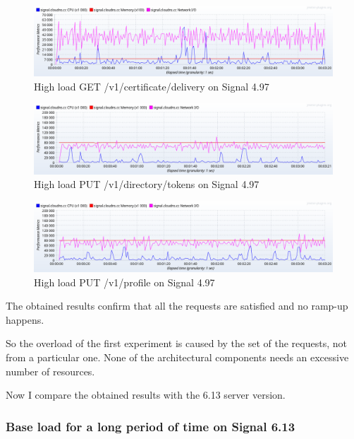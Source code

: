 \begin{figure}[H]
    \centering
    \includegraphics[width=\textwidth]{images/497/create-load-6}
    \caption{High load GET /v1/certificate/delivery on Signal 4.97}
    \label{fig:signalload6old}
\end{figure}


\begin{figure}[H]
    \centering
    \includegraphics[width=\textwidth]{images/497/create-load-7}
    \caption{High load PUT /v1/directory/tokens on Signal 4.97}
    \label{fig:signalload7old}
\end{figure}


\begin{figure}[H]
    \centering
    \includegraphics[width=\textwidth]{images/497/create-load-8}
    \caption{High load PUT /v1/profile on Signal 4.97}
    \label{fig:signalload8old}
\end{figure}

The obtained results confirm that all the requests are satisfied and no ramp-up happens.

So the overload of the first experiment is caused by the set of the requests, not from a particular one. None of the architectural components needs an excessive number of resources.

Now I compare the obtained results with the 6.13 server version.

\subsubsection{Base load for a long period of time on Signal 6.13}

